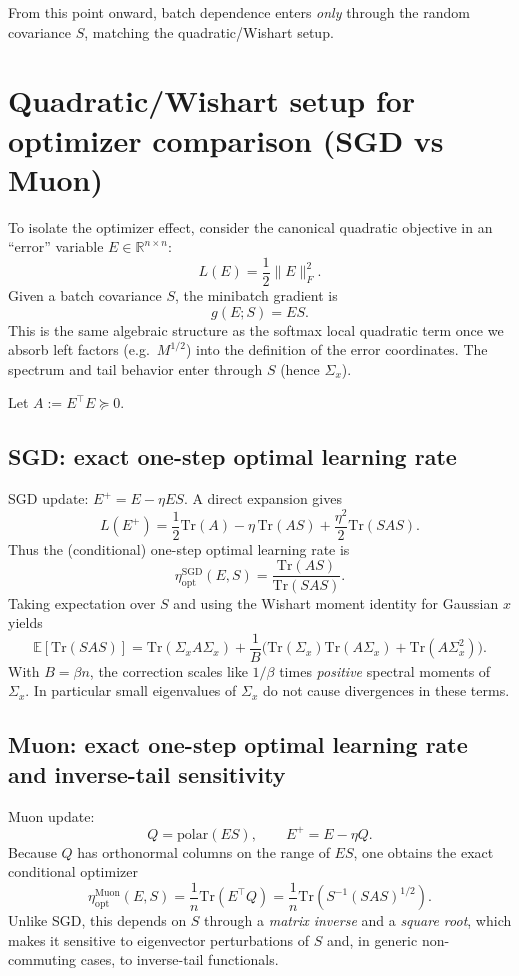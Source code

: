 \documentclass[11pt]{article}
\begin{document}
From this point onward, batch dependence enters \emph{only} through the random covariance $S$,
matching the quadratic/Wishart setup.

\section{Quadratic/Wishart setup for optimizer comparison (SGD vs Muon)}

To isolate the optimizer effect, consider the canonical quadratic objective in an ``error'' variable $E\in\mathbb{R}^{n\times n}$:
\[
L(E)=\frac12\|E\|_F^2.
\]
Given a batch covariance $S$, the minibatch gradient is
\[
g(E;S)=ES.
\]
This is the same algebraic structure as the softmax local quadratic term once we absorb left factors (e.g.\ $M^{1/2}$)
into the definition of the error coordinates. The spectrum and tail behavior enter through $S$ (hence $\Sigma_x$).

Let $A:=E^\top E\succeq 0$.

\subsection{SGD: exact one-step optimal learning rate}
SGD update: $E^+=E-\eta ES$.
A direct expansion gives
\[
L(E^+)=\frac12\mathrm{Tr}(A) - \eta\,\mathrm{Tr}(AS) + \frac{\eta^2}{2}\mathrm{Tr}(SAS).
\]
Thus the (conditional) one-step optimal learning rate is
\[
\eta_{\mathrm{opt}}^{\mathrm{SGD}}(E,S)=\frac{\mathrm{Tr}(AS)}{\mathrm{Tr}(SAS)}.
\]
Taking expectation over $S$ and using the Wishart moment identity for Gaussian $x$ yields
\[
\mathbb{E}[\mathrm{Tr}(SAS)]
=
\mathrm{Tr}(\Sigma_x A \Sigma_x)
+
\frac{1}{B}
\Big(
\mathrm{Tr}(\Sigma_x)\mathrm{Tr}(A\Sigma_x)
+\mathrm{Tr}(A\Sigma_x^2)
\Big).
\]
With $B=\beta n$, the correction scales like $1/\beta$ times \emph{positive} spectral moments of $\Sigma_x$.
In particular small eigenvalues of $\Sigma_x$ do not cause divergences in these terms.

\subsection{Muon: exact one-step optimal learning rate and inverse-tail sensitivity}
Muon update:
\[
Q=\mathrm{polar}(ES),
\qquad
E^+=E-\eta Q.
\]
Because $Q$ has orthonormal columns on the range of $ES$, one obtains the exact conditional optimizer
\[
\eta_{\mathrm{opt}}^{\mathrm{Muon}}(E,S)
=\frac{1}{n}\mathrm{Tr}(E^\top Q)
=\frac{1}{n}\mathrm{Tr}\!\left(S^{-1}(SAS)^{1/2}\right).
\]
Unlike SGD, this depends on $S$ through a \emph{matrix inverse} and a \emph{square root}, which makes it sensitive to
eigenvector perturbations of $S$ and, in generic non-commuting cases, to inverse-tail functionals.
\end{document}
